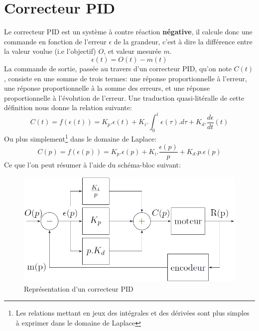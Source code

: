     \section{Correcteur PID}
        Le correcteur PID est un système à contre réaction \textbf{négative}, il calcule donc une commande en fonction de l'erreur $\epsilon$ de la grandeur, c'est à dire la différence entre la valeur voulue (i.e l'objectif) $O$, et valeur mesurée $m$.
        \begin{equation}
            \epsilon (t) = O(t) - m(t)
        \end{equation}
        La commande de sortie, passée au travers d'un correcteur PID, qu'on note $C(t)$, consiste en une somme de trois termes: une réponse proportionnelle à l'erreur, une réponse proportionnelle à la somme des erreurs, et une réponse proportionnelle à l'évolution de l'erreur. Une traduction quasi-litéralle de cette définition nous donne la relation suivante:
        \begin{equation}
            C(t) = f(\epsilon(t)) = K_p . \epsilon(t) + K_i . \int_{0}^{t}\epsilon(\tau).d\tau + K_d . \frac{d\epsilon}{dt}(t)
        \end{equation}
        Ou plus simplement\footnote{Les relations mettant en jeux des intégrales et des dérivées sont plus simples à exprimer dans le domaine de Laplace} dans le domaine de Laplace:
        \begin{equation}
            C(p) = f(\epsilon(p)) = K_p . \epsilon(p) + K_i . \frac{\epsilon(p)}{p} + K_d.p.\epsilon(p)
        \end{equation}
        Ce que l'on peut résumer à l'aide du schéma-bloc suivant:
        \begin{figure}[h]
            \centering
            \includegraphics[scale=0.35]{assets/PID.png}
            \caption{Représentation d'un correcteur PID}
        \end{figure}

